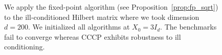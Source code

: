 \documentclass[sn-nature]{sn-jnl}%
\theoremstyle{thmstyleone}%
\theoremstyle{thmstyletwo}%
\theoremstyle{thmstylethree}%
\begin{document}
\begin{figure}[htbp]
\begin{minipage}[b]{0.45\textwidth}
  \end{minipage}
  \caption{We apply the fixed-point algorithm (see Proposition~\ref{prop:fp_sqrt}) to the ill-conditioned Hilbert matrix where we took dimension $d=200$. We initialized all algorithms at $X_0 = 3 I_d$. The benchmarks fail to converge whereas CCCP exhibits robustness to ill conditioning.}
  \label{fig: square_root_exp_ill}
\end{figure}












    
\end{document}
